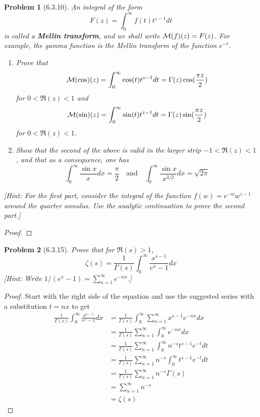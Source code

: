 \documentclass[10pt]{article}
\newcommand{\sk}{\vskip 10mm}
\theoremstyle{plain}
\newtheorem{problem}{Problem}
\theoremstyle{remark}
\begin{document}
\begin{problem}[6.3.10]
  An integral of the form
  \[
    F(z)=\int_0^\infty f(t)t^{z-1}dt
  \]
  is called a \textbf{Mellin transform}, and we shall write
  ${\cal M}(f)(z)=F(z)$. For example, the gamma function is the Mellin
  transform of the function $e^{-t}$.
  \begin{enumerate}
  \item[(a)] Prove that
    \[
      {\cal M}(\cos)(z)=\int_0^\infty\cos(t)t^{z-1}dt=\Gamma(z)\cos(\frac{\pi z}{2})
    \]
    for $0<\Re(z)<1$ and
    \[
      {\cal M}(\sin)(z)=\int_0^\infty\sin(t)t^{z-1}dt=\Gamma(z)\sin(\frac{\pi z}{2})
    \]
    for $0<\Re(z)<1$.
  \item[(b)] Show that the second of the above is valid in the larger strip
    $-1<\Re(z)<1$, and that as a consequence, one has
    \[
      \int_0^\infty \frac{\sin x}{x}dx=\frac{\pi}{2}\quad \text{and}\quad \int_0^\infty\frac{\sin x}{x^{3/2}}dx=\sqrt{2\pi}
    \]
  \end{enumerate}
  [Hint: For the first part, consider the integral of the function
  $f(w)=e^{-w}w^{z-1}$ around the quarter annulus. Use the analytic continuation
  to prove the second part.]
\end{problem}

\begin{proof}
  
\end{proof}

\sk

\begin{problem}[6.3.15]
  Prove that for $\Re(s)>1$,
  \[
    \zeta(s)=\frac{1}{\Gamma(s)}\int_0^\infty\frac{x^{s-1}}{e^x-1}dx
  \]
  [Hint: Write $1/(e^x-1)=\sum_{n=1}^\infty e^{-nx}$.]
\end{problem}

\begin{proof}
  Start with the right side of the equation and use the suggested series
  with a substitution $t=nx$ to get
  \begin{align*}
    \frac{1}{\Gamma(s)}\int_0^\infty \frac{x^{s-1}}{e^x-1}dx &= \frac{1}{\Gamma(s)}\int_0^\infty\sum_{n=1}^\infty x^{s-1}e^{-nx}dx\\
                                                &=\frac{1}{\Gamma(s)}\sum_{n=1}^\infty \int_0^\infty e^{-nx}dx\\
                                                &=\frac{1}{\Gamma(s)}\sum_{n=1}^\infty \int_0^\infty n^{-s}t^{s-1}e^{-t}dt\\
                                                &=\frac{1}{\Gamma(s)}\sum_{n=1}^\infty n^{-s}\int_0^\infty t^{s-1}e^{-t}dt\\
                                                &=\frac{1}{\Gamma(s)}\sum_{n=1}^\infty n^{-s}\Gamma(s)\\
                                                &=\sum_{n=1}^\infty n^{-s}\\
                                                &= \zeta(s)
  \end{align*}
\end{proof}

\end{document}
